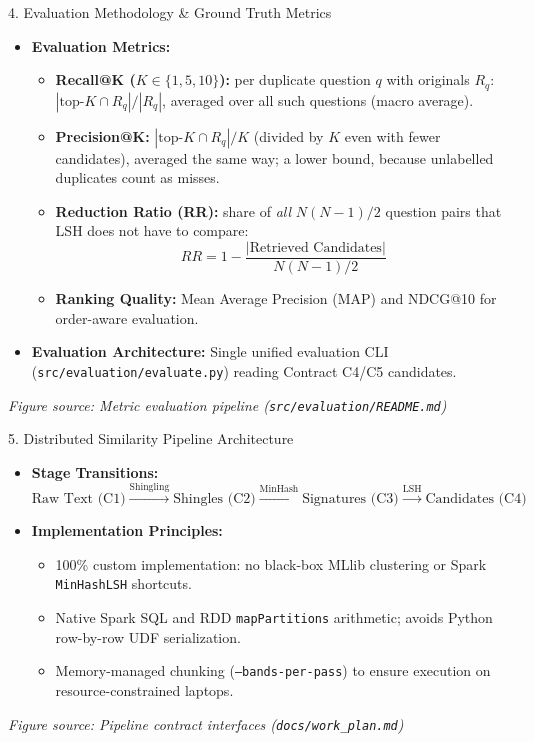 \documentclass[aspectratio=169,10pt]{beamer}
\begin{document}
\begin{frame}{4. Evaluation Methodology \& Ground Truth Metrics}
  \begin{itemize}
    \item \textbf{Evaluation Metrics:}
      \begin{itemize}
        \item \textbf{Recall@K ($K \in \{1, 5, 10\}$):} per duplicate question $q$ with originals $R_q$: $|\text{top-}K \cap R_q| / |R_q|$, averaged over all such questions (macro average).
        \item \textbf{Precision@K:} $|\text{top-}K \cap R_q| / K$ (divided by $K$ even with fewer candidates), averaged the same way; a lower bound, because unlabelled duplicates count as misses.
        \item \textbf{Reduction Ratio (RR):} share of \emph{all} $N(N-1)/2$ question pairs that LSH does not have to compare:
          \[ RR = 1 - \frac{|\text{Retrieved Candidates}|}{N(N-1)/2} \]
        \item \textbf{Ranking Quality:} Mean Average Precision (MAP) and NDCG@10 for order-aware evaluation.
      \end{itemize}
    \item \textbf{Evaluation Architecture:} Single unified evaluation CLI (\texttt{src/evaluation/evaluate.py}) reading Contract C4/C5 candidates.
  \end{itemize}
  \vfill
  \footnotesize{\textit{Figure source: Metric evaluation pipeline (\texttt{src/evaluation/README.md})}}
\end{frame}


\begin{frame}{5. Distributed Similarity Pipeline Architecture}
  \begin{itemize}
    \item \textbf{Stage Transitions:}
      \[ \text{Raw Text (C1)} \xrightarrow{\text{Shingling}} \text{Shingles (C2)} \xrightarrow{\text{MinHash}} \text{Signatures (C3)} \xrightarrow{\text{LSH}} \text{Candidates (C4)} \]
    \item \textbf{Implementation Principles:}
      \begin{itemize}
        \item 100\% custom implementation: no black-box MLlib clustering or Spark \texttt{MinHashLSH} shortcuts.
        \item Native Spark SQL and RDD \texttt{mapPartitions} arithmetic; avoids Python row-by-row UDF serialization.
        \item Memory-managed chunking (\texttt{--bands-per-pass}) to ensure execution on resource-constrained laptops.
      \end{itemize}
  \end{itemize}
  \vfill
  \footnotesize{\textit{Figure source: Pipeline contract interfaces (\texttt{docs/work\_plan.md})}}
\end{frame}
\end{document}
